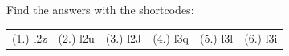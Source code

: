  \label{m38711**end}
  \label{324e353f2415b0f24a8077f8f18039bb**end}
\par {} Find the answers with the shortcodes:
 \par \begin{tabular}[h]{cccccc}
 (1.) l2z  &  (2.) l2u  &  (3.) l2J  &  (4.) l3q  &  (5.) l3l  &  (6.) l3i  & \end{tabular}

